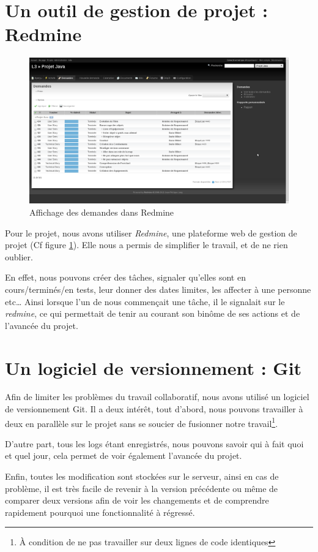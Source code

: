 \documentclass[12pt,a4paper,openany]{book}
\begin{document}
	\section{Un outil de gestion de projet : Redmine}
	\begin{figure}[H]
		\centering
		\includegraphics[width=18cm]{screens/redmine.png}
		\caption{Affichage des demandes dans Redmine}
		\label{fig:redmine}
	\end{figure}
	Pour le projet, nous avons utiliser \textit{Redmine}, une plateforme web de gestion de projet (Cf figure \ref{fig:redmine}). Elle nous a permis de simplifier le travail, et
	de ne rien oublier.

	En effet, nous pouvons créer des tâches, signaler qu'elles sont en cours/terminés/en tests, leur donner des dates limites, les affecter à une personne etc\ldots
	Ainsi lorsque l'un de nous commençait une tâche, il le signalait sur le \textit{redmine}, ce qui permettait de tenir au courant son binôme de ses actions et
	de l'avancée du projet.

	\section{Un logiciel de versionnement : Git}
	Afin de limiter les problèmes du travail collaboratif, nous avons utilisé un logiciel de versionnement Git. Il a deux intérêt, tout d'abord, nous pouvons
	travailler à deux en parallèle sur le projet sans se soucier de fusionner notre travail\footnote{À condition de ne pas travailler sur deux lignes de code
	identiques}.

	D'autre part, tous les logs étant enregistrés, nous pouvons savoir qui à fait quoi et quel jour, cela permet de voir également l'avancée du projet. 

	Enfin, toutes les modification sont stockées sur le serveur, ainsi en cas de problème, il est très facile de revenir à la version précédente ou même de
	comparer deux versions afin de voir les changements et de comprendre rapidement pourquoi une fonctionnalité à régressé. 
\end{document}

